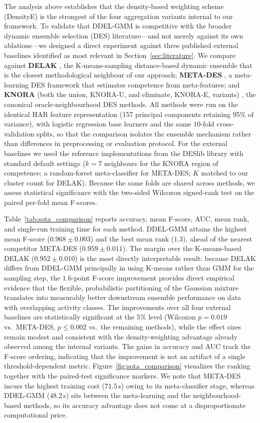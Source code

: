 \documentclass[lettersize,journal]{IEEEtran}
\begin{document}
	\noindent The analysis above establishes that the density-based weighting scheme (DensityE) is the strongest of the four aggregation variants internal to our framework. To validate that DDEL-GMM is competitive with the broader dynamic ensemble selection (DES) literature—and not merely against its own ablations—we designed a direct experiment against three published external baselines identified as most relevant in Section~\ref{sec:literature}. We compare against \textbf{DELAK} \cite{guo_dynamic_2021}, the K-means-sampling distance-based dynamic ensemble that is the closest methodological neighbour of our approach; \textbf{META-DES} \cite{cruz_meta-oracle_2017}, a meta-learning DES framework that estimates competence from meta-features; and \textbf{KNORA} (both the union, KNORA-U, and eliminate, KNORA-E, variants) \cite{ko_dynamic_2008}, the canonical oracle-neighbourhood DES methods. All methods were run on the identical HAR feature representation (157 principal components retaining 95\% of variance), with logistic regression base learners and the same $10$-fold cross-validation splits, so that the comparison isolates the ensemble mechanism rather than differences in preprocessing or evaluation protocol. For the external baselines we used the reference implementations from the DESlib library with standard default settings ($k=7$ neighbours for the KNORA region of competence; a random-forest meta-classifier for META-DES; $K$ matched to our cluster count for DELAK). Because the same folds are shared across methods, we assess statistical significance with the two-sided Wilcoxon signed-rank test on the paired per-fold mean F-scores.
	
	\noindent Table~\ref{tab:sota_comparison} reports accuracy, mean F-score, AUC, mean rank, and single-run training time for each method. DDEL-GMM attains the highest mean F-score ($0.968 \pm 0.003$) and the best mean rank ($1.3$), ahead of the nearest competitor META-DES ($0.959 \pm 0.011$). The margin over the K-means-based DELAK ($0.952 \pm 0.010$) is the most directly interpretable result: because DELAK differs from DDEL-GMM principally in using K-means rather than GMM for the sampling step, the $1.6$-point F-score improvement provides direct empirical evidence that the flexible, probabilistic partitioning of the Gaussian mixture translates into measurably better downstream ensemble performance on data with overlapping activity classes. The improvements over all four external baselines are statistically significant at the $5\%$ level (Wilcoxon $p = 0.019$ vs.\ META-DES, $p \leq 0.002$ vs.\ the remaining methods), while the effect sizes remain modest and consistent with the density-weighting advantage already observed among the internal variants. The gains in accuracy and AUC track the F-score ordering, indicating that the improvement is not an artifact of a single threshold-dependent metric. Figure~\ref{fig:sota_comparison} visualizes the ranking together with the paired-test significance markers. We note that META-DES incurs the highest training cost ($71.5$\,s) owing to its meta-classifier stage, whereas DDEL-GMM ($48.2$\,s) sits between the meta-learning and the neighbourhood-based methods, so its accuracy advantage does not come at a disproportionate computational price.
	
\end{document}
